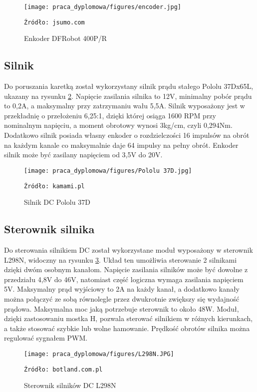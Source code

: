 \begin{figure}
    \centering
    \texttt{[image: praca\_dyplomowa/figures/encoder.jpg]}
    \caption{Enkoder DFRobot 400P/R}
    \texttt{Źródło: jsumo.com}
    \label{fig:Enkoder}
\end{figure}

\subsection{Silnik}
Do poruszania karetką został wykorzystany silnik prądu stałego Pololu 37Dx65L, ukazany na rysunku \ref{fig:Silnik}. Napięcie zasilania silnika to 12V, minimalny pobór prądu to 0,2A, a maksymalny przy zatrzymaniu wału 5,5A. Silnik wyposażony jest w przekładnię o przełożeniu 6,25:1, dzięki której osiąga 1600 RPM przy nominalnym napięciu, a moment obrotowy wynosi 3kg/cm, czyli 0,294Nm. Dodatkowo silnik posiada własny enkoder o rozdzielczości 16 impulsów na obrót na każdym kanale co maksymalnie daje 64 impulsy na pełny obrót. Enkoder silnik może być zasilany napięciem od 3,5V do 20V. 

\begin{figure}
    \centering
    \texttt{[image: praca\_dyplomowa/figures/Pololu 37D.jpg]}
    \caption{Silnik DC Pololu 37D}
    \texttt{Źródło: kamami.pl}
    \label{fig:Silnik}
\end{figure}

\subsection{Sterownik silnika}
Do sterowania silnikiem DC został wykorzystane moduł wyposażony w sterownik L298N, widoczny na rysunku \ref{fig:L298N}. Układ ten umożliwia sterowanie 2 silnikami dzięki dwóm osobnym kanałom. Napięcie zasilania silników może być dowolne z przedziału 4,8V do 46V, natomiast część logiczna wymaga zasilania napięciem 5V. Maksymalny prąd wyjściowy to 2A na każdy kanał, a dodatkowo kanały można połączyć ze sobą równolegle przez dwukrotnie zwiększy się wydajność prądowa. Maksymalna moc jaką potrzebuje sterownik to około 48W. Moduł, dzięki zastosowaniu mostka H, pozwala sterować silnikiem w różnych kierunkach, a także stosować szybkie lub wolne hamowanie. Prędkość obrotów silnika można regulować sygnałem PWM.

\begin{figure}
    \centering
    \texttt{[image: praca\_dyplomowa/figures/L298N.JPG]}
    \caption{Sterownik silników DC L298N}
    \texttt{Źródło: botland.com.pl}
    \label{fig:L298N}
\end{figure}

